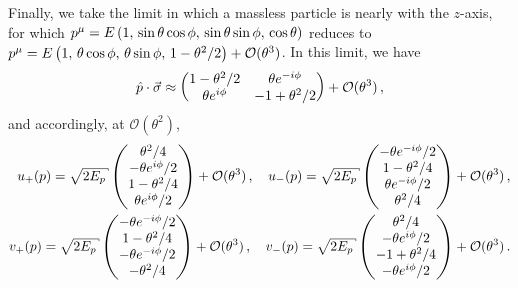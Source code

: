 \begin{subappendices}
\begin{example}
    \label{ex:collinear-bispinor}
    Finally, we take the limit in which a massless particle is nearly  with the \(z\)-axis, for which
    \(
        p^\mu
        =
        E \left(1, \, \sin\theta \cos\phi, \, \sin\theta \sin\phi, \, \cos\theta\right)
    \)
    reduces to
    \(
        p^\mu
        =
        E \left(1, \, \theta \cos\phi, \, \theta\sin\phi, \, 1 - \theta^2/2\right)
        +
        \mathcal{O}(\theta^3)
    \).
    In this limit, we have
    \begin{align}
        \hat{p}\cdot\vec{\sigma}
        \approx
        \begin{pmatrix}1 - \theta^2/2& \theta e^{-i\phi} \\ \theta e^{i\phi} & -1+\theta^2/2\end{pmatrix}
        +
        \mathcal{O}(\theta^3)
        \,,
    \end{align}
    and accordingly, at \(\mathcal{O}(\theta^2)\),
    \begin{align}
        \label{eq:bispinor-u-collinear}
        u_+(p)
        =
        \sqrt{2 E_p}
        \pmtrx{\theta^2/4 \\ -\theta e^{i\phi}/2 \\ 1-\theta^2/4 \\ \theta e^{i\phi}/2}
        +
        \mathcal{O}(\theta^3)
        \,,
        \quad
        u_-(p)
        =
        \sqrt{2 E_p}
        \pmtrx{-\theta e^{-i\phi}/2 \\ 1 - \theta^2/4\\ \theta e^{-i\phi}/2 \\  \theta^2/4}
        +
        \mathcal{O}(\theta^3)
        \,,
        \\
        \label{eq:bispinor-v-collinear}
        v_+(p)
        =
        \sqrt{2 E_p}
        \pmtrx{-\theta e^{-i\phi}/2 \\ 1 - \theta^2/4\\ -\theta e^{-i\phi}/2 \\ -\theta^2/4}
        +
        \mathcal{O}(\theta^3)
        \,,
        \quad
        v_-(p)
        =
        \sqrt{2 E_p}
        \pmtrx{\theta^2/4\\ -\theta e^{i\phi}/2 \\ -1+\theta^2/4 \\ -\theta e^{i\phi}/2}
        +
        \mathcal{O}(\theta^3)
        \,.
    \end{align}
\end{example}



\end{subappendices}

